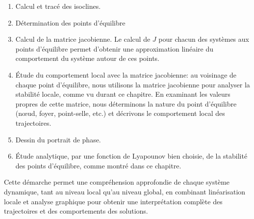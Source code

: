         \begin{enumerate}
            \item Calcul et tracé des isoclines.
            \item Détermination des points d'équilibre
            \item Calcul de la matrice jacobienne. Le calcul de $J$ pour chacun des systèmes aux points d’équilibre permet d'obtenir une approximation linéaire du comportement du système autour de ces points.
            \item Étude du comportement local avec la matrice jacobienne: au voisinage de chaque point d’équilibre, nous utilisons la matrice jacobienne pour analyser la stabilité locale, comme vu durant ce chapitre. En examinant les valeurs propres de cette matrice, nous déterminons la nature du point d'équilibre (nœud, foyer, point-selle, etc.) et décrivons le comportement local des trajectoires.
            \item Dessin du portrait de phase.
            \item Étude analytique, par une fonction de Lyapounov bien choisie, de la stabilité des points d'équilibre, comme montré dans ce chapitre.
            
        
        \end{enumerate}
        Cette démarche permet une compréhension approfondie de chaque système dynamique, tant au niveau local qu’au niveau global, en combinant linéarisation locale et analyse graphique pour obtenir une interprétation complète des trajectoires et des comportements des solutions.

